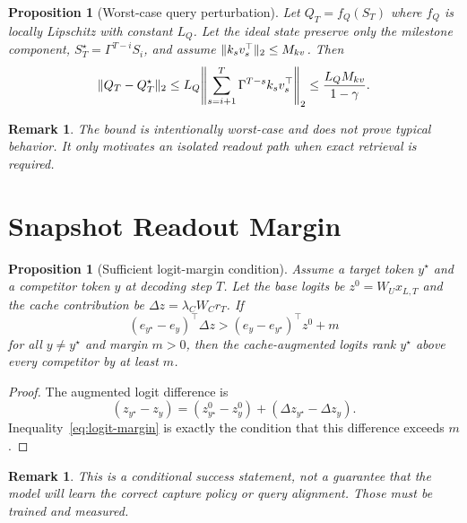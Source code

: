 \documentclass[11pt]{article}
\newtheorem{proposition}[theorem]{Proposition}
\newtheorem{remark}[theorem]{Remark}
\DeclarePairedDelimiter{\norm}{\lVert}{\rVert}
\begin{document}
\begin{proposition}[Worst-case query perturbation]
Let $Q_T=f_Q(S_T)$ where $f_Q$ is locally Lipschitz with constant $L_Q$. Let the ideal state preserve only the milestone component, $S_T^{\star}=\Gamma^{T-i}S_i$, and assume $\norm{k_s v_s^\top}_2\leq M_{kv}$. Then
\begin{equation}
\norm{Q_T-Q_T^{\star}}_2
\leq L_Q\norm*{\sum_{s=i+1}^{T}\Gamma^{T-s}k_s v_s^\top}_2
\leq \frac{L_Q M_{kv}}{1-\gamma}.
\end{equation}
\end{proposition}

\begin{remark}
The bound is intentionally worst-case and does not prove typical behavior. It only motivates an isolated readout path when exact retrieval is required.
\end{remark}

\section{Snapshot Readout Margin}
\label{app:snapshot}

\begin{proposition}[Sufficient logit-margin condition]\label{prop:logit-margin}
Assume a target token $y^\star$ and a competitor token $y$ at decoding step $T$. Let the base logits be $z^0=W_Ux_{L,T}$ and the cache contribution be $\Delta z=\lambda_C W_C r_T$. If
\begin{equation}
\label{eq:logit-margin}
(e_{y^\star}-e_y)^\top \Delta z
>
(e_y-e_{y^\star})^\top z^0 + m
\end{equation}
for all $y\neq y^\star$ and margin $m>0$, then the cache-augmented logits rank $y^\star$ above every competitor by at least $m$.
\end{proposition}

\begin{proof}
The augmented logit difference is
\begin{equation}
(z_{y^\star}-z_y)
= (z^0_{y^\star}-z^0_y) + (\Delta z_{y^\star}-\Delta z_y).
\end{equation}
Inequality~\eqref{eq:logit-margin} is exactly the condition that this difference exceeds $m$.
\end{proof}

\begin{remark}
This is a conditional success statement, not a guarantee that the model will learn the correct capture policy or query alignment. Those must be trained and measured.
\end{remark}
\end{document}
